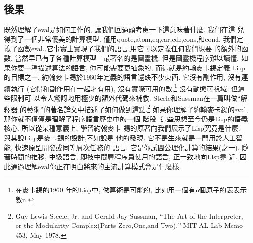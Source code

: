 \documentclass[12pt]{article}
\begin{document}
\begin{CJK}{UTF8}{bsmi}
\section{後果} 
既然理解了eval是如何工作的, 
讓我們回過頭考慮一下這意味著什麼. 
我們在這 
兒得到了一個非常優美的計算模型. 
僅用quote,atom,eq,car,cdr,cons,和cond, 
我們定義了函數eval.,它事實上實現了我們的語言,用它可以定義任何我們想要 
的額外的函數. 
當然早已有了各種計算模型---最著名的是圖靈機. 
但是圖靈機程序難以讀懂. 
如果你要一種描述算法的語言, 
你可能需要更抽象的, 
而這就是約翰麥卡錫定義 
Lisp的目標之一. 
約翰麥卡錫於1960年定義的語言還缺不少東西. 
它沒有副作用, 
沒有連續執行 
(它得和副作用在一起才有用), 
沒有實際可用的數,\footnote{在麥卡錫的1960 
年的Lisp中, 
做算術是可能的, 
比如用一個有n個原子的表表示數n.} 
沒有動態可視域. 
但這些限制可 
以令人驚訝地用極少的額外代碼來補救. 
Steele和Sussman在一篇叫做``解釋器 
的藝術''的著名論文中描述了如何做到這點.\footnote{Guy 
Lewis 
Steele, 
Jr. 
and 
Gerald 
Jay 
Sussman, 
``The 
Art 
of 
the 
Interpreter, 
or 
the 
Modularity 
Complex(Parts 
Zero,One,and 
Two),'' 
MIT 
AL 
Lab 
Memo 
453, 
May 
1978.} 
如果你理解了約翰麥卡錫的eval, 
那你就不僅僅是理解了程序語言歷史中的一個 
階段. 
這些思想至今仍是Lisp的語義核心. 
所以從某種意義上, 
學習約翰麥卡 
錫的原著向我們展示了Lisp究竟是什麼. 
與其說Lisp是麥卡錫的設計,不如說是 
他的發現. 
它不是生來就是一門用於人工智能, 
快速原型開發或同等層次任務的 
語言. 
它是你試圖公理化計算的結果(之一). 
隨著時間的推移, 
中級語言, 
即被中間層程序員使用的語言, 
正一致地向Lisp靠 
近. 
因此通過理解eval你正在明白將來的主流計算模式會是什麼樣. 

\end{CJK}
\end{document}
